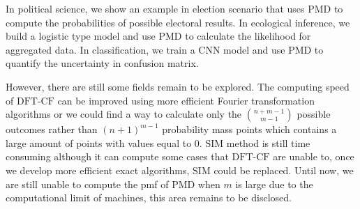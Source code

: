 \documentclass[12pt]{article}
\newcommand{\PMD}{\textrm{PMD}}
\newcommand{\SIM}{{\textrm{SIM}}}
\newcommand{\dft}{{\textrm{DFT-CF}}}
\begin{document}
In political science, we show an example in election scenario that uses $\PMD$ to compute the probabilities of possible electoral results. In ecological inference, we build a logistic type model and use $\PMD$ to calculate the likelihood for aggregated data. In classification, we train a CNN model and use $\PMD$ to quantify the uncertainty in confusion matrix.



However, there are still some fields remain to be explored. The computing speed of $\dft$ can be improved using more efficient Fourier transformation algorithms or we could find a way to calculate only the $\binom{n+m-1}{m-1}$ possible outcomes rather than $(n+1)^{m-1}$ probability mass points which contains a large amount of points with values equal to 0. $\SIM$ method is still time consuming although it can compute some cases that $\dft$ are unable to, once we develop more efficient exact algorithms, $\SIM$ could be replaced. Until now, we are still unable to compute the pmf of $\PMD$ when $m$ is large due to the computational limit of machines, this area remains to be disclosed.



%



%	
	
\end{document}
